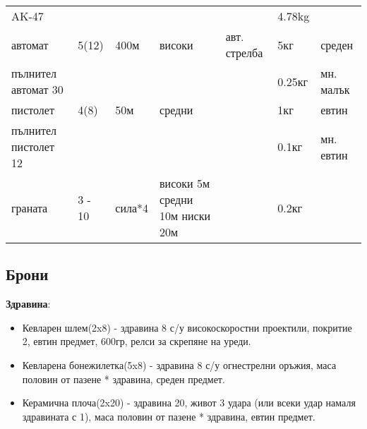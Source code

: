 \begin{tabular}{p{2cm} | p{2cm} | p{2cm} | p{2cm} | p{2cm} | p{2cm} | p{2cm}}
AK-47                 &                      &            &            &                & 4.78kg        &                  \\  %
%
автомат               & 5(12)                & 400м       & високи     & авт. стрелба   & 5кг           & среден           \\
пълнител автомат 30   &                      &            &            &                & 0.25кг        & мн. малък        \\
пистолет              & 4(8)                 & 50м        & средни     &                & 1кг           & евтин            \\  %
пълнител пистолет 12  &                      &            &            &                & 0.1кг         & мн. евтин        \\
граната               & 3 - 10               & сила*4     & високи 5м средни 10м ниски 20м & & 0.2кг    &                  \\

\end{tabular}

\subsection{Брони}
\textbf{Здравина}:
\begin{itemize}[topsep=-0cm, partopsep=0cm, parsep=0cm, itemsep=0cm]
\item{Кевларен шлем(2x8) - здравина 8 с/у високоскоростни проектили, покритие 2, евтин предмет, 600гр, релси за скрепяне на уреди.}
\item{Кевларена бонежилетка(5x8) - здравина 8 с/у огнестрелни оръжия, маса половин от пазене * здравина, среден предмет.}
\item{Керамична плоча(2x20) - здравина 20, живот 3 удара (или всеки удар намаля здравината с 1), маса половин от пазене * здравина, евтин предмет.}
\end{itemize}

